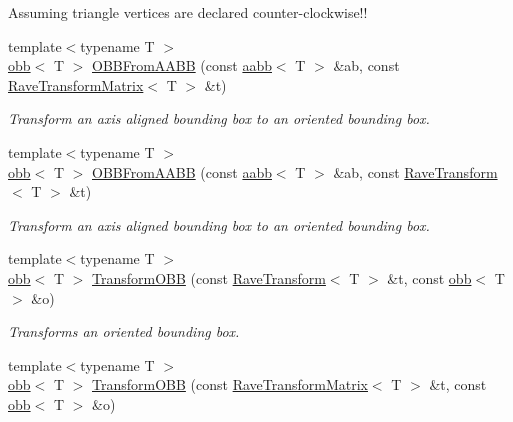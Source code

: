 \begin{DoxyCompactItemize}
\begin{DoxyCompactList}
Assuming triangle vertices are declared counter-\/clockwise!! \item\end{DoxyCompactList}\item 
{\footnotesize template$<$typename T $>$ }\\\hyperlink{classOpenRAVE_1_1geometry_1_1obb}{obb}$<$ T $>$ \hyperlink{group__geometric__primitives_ga1aaf2360c518e6a9106315a87aaec95d}{OBBFromAABB} (const \hyperlink{classOpenRAVE_1_1geometry_1_1aabb}{aabb}$<$ T $>$ \&ab, const \hyperlink{classOpenRAVE_1_1geometry_1_1RaveTransformMatrix}{RaveTransformMatrix}$<$ T $>$ \&t)
\begin{DoxyCompactList}\small\item\em Transform an axis aligned bounding box to an oriented bounding box. \item\end{DoxyCompactList}\item 
{\footnotesize template$<$typename T $>$ }\\\hyperlink{classOpenRAVE_1_1geometry_1_1obb}{obb}$<$ T $>$ \hyperlink{group__geometric__primitives_ga645564c4c561b14b14b90d6d02c0e766}{OBBFromAABB} (const \hyperlink{classOpenRAVE_1_1geometry_1_1aabb}{aabb}$<$ T $>$ \&ab, const \hyperlink{classOpenRAVE_1_1geometry_1_1RaveTransform}{RaveTransform}$<$ T $>$ \&t)
\begin{DoxyCompactList}\small\item\em Transform an axis aligned bounding box to an oriented bounding box. \item\end{DoxyCompactList}\item 
{\footnotesize template$<$typename T $>$ }\\\hyperlink{classOpenRAVE_1_1geometry_1_1obb}{obb}$<$ T $>$ \hyperlink{group__geometric__primitives_ga94bf61739c3a0110d5230da07bde8b37}{TransformOBB} (const \hyperlink{classOpenRAVE_1_1geometry_1_1RaveTransform}{RaveTransform}$<$ T $>$ \&t, const \hyperlink{classOpenRAVE_1_1geometry_1_1obb}{obb}$<$ T $>$ \&o)
\begin{DoxyCompactList}\small\item\em Transforms an oriented bounding box. \item\end{DoxyCompactList}\item 
{\footnotesize template$<$typename T $>$ }\\\hyperlink{classOpenRAVE_1_1geometry_1_1obb}{obb}$<$ T $>$ \hyperlink{group__geometric__primitives_ga588d811884a84cddef8910f749dc5aee}{TransformOBB} (const \hyperlink{classOpenRAVE_1_1geometry_1_1RaveTransformMatrix}{RaveTransformMatrix}$<$ T $>$ \&t, const \hyperlink{classOpenRAVE_1_1geometry_1_1obb}{obb}$<$ T $>$ \&o)

\end{DoxyCompactItemize}
